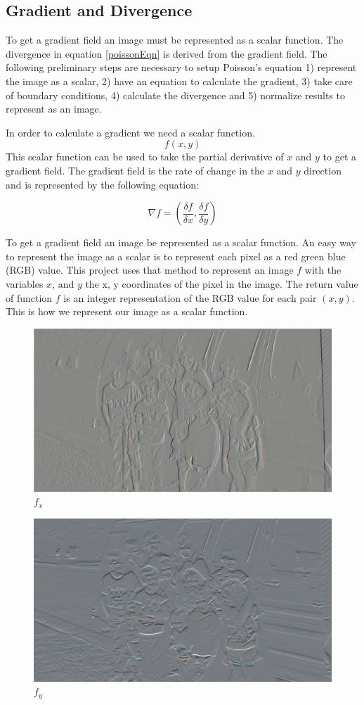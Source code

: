 \documentclass[10pt,twopage]{acmsiggraph}
\begin{document}
\subsection{Gradient and Divergence}

To get a gradient field an image must be represented as a scalar function. The divergence in equation \ref{poissonEqn} is derived from the gradient field. The following preliminary steps  are necessary to setup Poisson's equation 1) represent the image as a scalar, 2) have an equation to calculate the gradient, 3) take care of boundary conditions, 4) calculate the divergence and 5) normalize results to represent as an image.

In order to calculate a gradient we need a scalar function.
\begin{equation}
\ensuremath{f(x,y)}
\label{scalar}
\end{equation}
This scalar function can be used to take the partial derivative of $x$ and $y$ to get a gradient field. The gradient field is the rate of change in the $x$ and $y$ direction and is represented by the following equation:

\begin{equation}
\label{gradient}
\ensuremath{\nabla f = ( \frac{\delta f}{\delta x} , \frac{\delta f}{\delta y} )}
\end{equation}

To get a gradient field an image be represented as a scalar function. An easy way to represent the image as a scalar is to represent each pixel as a red green blue (RGB) value. This project uses that method to represent an image $f$ with the variables $x$, and $y$ the x, y coordinates of the pixel in the image. The return value of function $f$ is an integer representation of the RGB value for each pair $(x,y)$. This is how we represent our image as a scalar function.

\begin{figure}
\centering
\includegraphics[width=.44\textwidth]{fig/gradientX.jpg}
\caption{\ensuremath{f_{x}}}
\label{ImageX}
\end{figure}

\begin{figure}
\centering
\includegraphics[width=.44\textwidth]{fig/gradientY.jpg}
\caption{\ensuremath{f_{y}}}   
\label{ImageY}
\end{figure}
\end{document}
